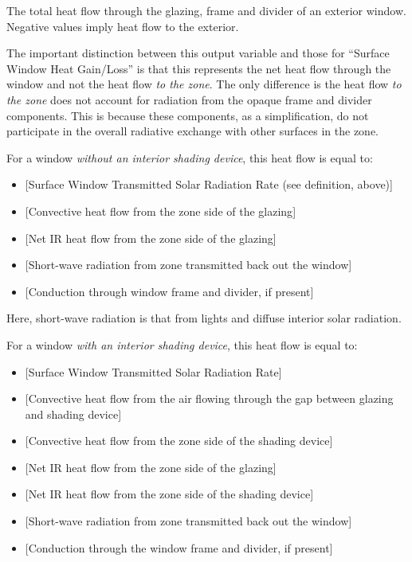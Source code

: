 The total heat flow through the glazing, frame and divider of an exterior window. Negative values imply heat flow to the exterior.

The important distinction between this output variable and those for ``Surface Window Heat Gain/Loss'' is that this represents the net heat flow through the window and not the heat flow \emph{to the zone}. The only difference is the heat flow \emph{to the zone} does not account for radiation from the opaque frame and divider components. This is because these components, as a simplification, do not participate in the overall radiative exchange with other surfaces in the zone.

For a window \emph{without an interior shading device}, this heat flow is equal to:

\begin{itemize}
\item
  {[}Surface Window Transmitted Solar Radiation Rate (see definition, above){]}
\item
  {[}Convective heat flow from the zone side of the glazing{]}
\item
  {[}Net IR heat flow from the zone side of the glazing{]}
\item
  {[}Short-wave radiation from zone transmitted back out the window{]}
\item
  {[}Conduction through window frame and divider, if present{]}
\end{itemize}

Here, short-wave radiation is that from lights and diffuse interior solar radiation.

For a window \emph{with an interior shading device}, this heat flow is equal to:


\begin{itemize}
\item
  {[}Surface Window Transmitted Solar Radiation Rate{]}
\item
  {[}Convective heat flow from the air flowing through the gap between glazing and shading device{]}
\item
  {[}Convective heat flow from the zone side of the shading device{]}
\item
  {[}Net IR heat flow from the zone side of the glazing{]}
\item
  {[}Net IR heat flow from the zone side of the shading device{]}
\item
  {[}Short-wave radiation from zone transmitted back out the window{]}
\item
  {[}Conduction through the window frame and divider, if present{]}
\end{itemize}

